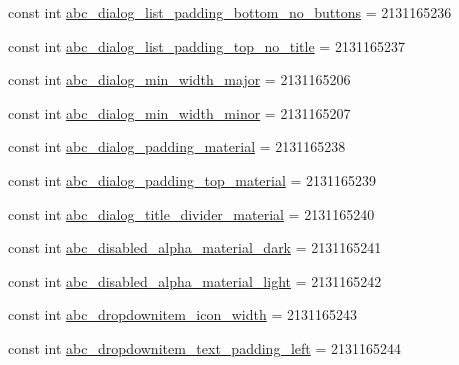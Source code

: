 \begin{DoxyCompactItemize}
\item 
const int \mbox{\hyperlink{class_f_w_p_s___app_1_1_droid_1_1_resource_1_1_dimension_a8c9175c3bb2fa5b31b331d892c5948fb}{abc\+\_\+dialog\+\_\+list\+\_\+padding\+\_\+bottom\+\_\+no\+\_\+buttons}} = 2131165236
\item 
const int \mbox{\hyperlink{class_f_w_p_s___app_1_1_droid_1_1_resource_1_1_dimension_ab13578b837f96872bdf61cf6d501542b}{abc\+\_\+dialog\+\_\+list\+\_\+padding\+\_\+top\+\_\+no\+\_\+title}} = 2131165237
\item 
const int \mbox{\hyperlink{class_f_w_p_s___app_1_1_droid_1_1_resource_1_1_dimension_aba68134a2bf1b9db5c386c37fa63a861}{abc\+\_\+dialog\+\_\+min\+\_\+width\+\_\+major}} = 2131165206
\item 
const int \mbox{\hyperlink{class_f_w_p_s___app_1_1_droid_1_1_resource_1_1_dimension_a2e5b83246905f715780350a246537b5f}{abc\+\_\+dialog\+\_\+min\+\_\+width\+\_\+minor}} = 2131165207
\item 
const int \mbox{\hyperlink{class_f_w_p_s___app_1_1_droid_1_1_resource_1_1_dimension_af1b9addfbbe74e7a570abac50ecf111b}{abc\+\_\+dialog\+\_\+padding\+\_\+material}} = 2131165238
\item 
const int \mbox{\hyperlink{class_f_w_p_s___app_1_1_droid_1_1_resource_1_1_dimension_a46749274443a69b3c129a5b1ee83fff2}{abc\+\_\+dialog\+\_\+padding\+\_\+top\+\_\+material}} = 2131165239
\item 
const int \mbox{\hyperlink{class_f_w_p_s___app_1_1_droid_1_1_resource_1_1_dimension_a1807e4306bf9b7df43c1a2b8c6f33da2}{abc\+\_\+dialog\+\_\+title\+\_\+divider\+\_\+material}} = 2131165240
\item 
const int \mbox{\hyperlink{class_f_w_p_s___app_1_1_droid_1_1_resource_1_1_dimension_a07aca11f9af754be140ccc9c8ce9196d}{abc\+\_\+disabled\+\_\+alpha\+\_\+material\+\_\+dark}} = 2131165241
\item 
const int \mbox{\hyperlink{class_f_w_p_s___app_1_1_droid_1_1_resource_1_1_dimension_af0eeebbaf94808075b4415fe62ea24c8}{abc\+\_\+disabled\+\_\+alpha\+\_\+material\+\_\+light}} = 2131165242
\item 
const int \mbox{\hyperlink{class_f_w_p_s___app_1_1_droid_1_1_resource_1_1_dimension_a6c50331387c3a457db8365ff849fe2f4}{abc\+\_\+dropdownitem\+\_\+icon\+\_\+width}} = 2131165243
\item 
const int \mbox{\hyperlink{class_f_w_p_s___app_1_1_droid_1_1_resource_1_1_dimension_a4febdd0541cfdb2f373e76dd3250253e}{abc\+\_\+dropdownitem\+\_\+text\+\_\+padding\+\_\+left}} = 2131165244
\item 

\end{DoxyCompactItemize}
